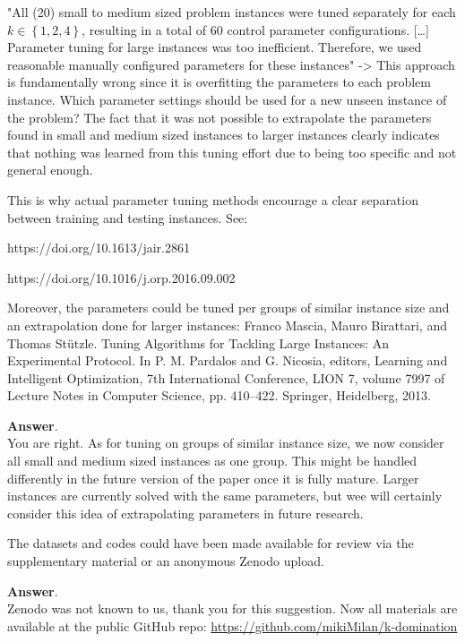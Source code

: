 \documentclass [11pt]{scrartcl}
\begin{document}
\begin{leftbar}
"All (20) small to medium sized problem instances were tuned separately for each $k\in\left\lbrace 1, 2, 4\right\rbrace $, resulting in a total of 60 control parameter configurations. […] Parameter tuning for large instances was too inefficient. Therefore, we used reasonable manually configured parameters for these
instances"
-> This approach is fundamentally wrong since it is overfitting the parameters to each problem instance. Which parameter settings should be used for a new unseen instance of the problem? The fact that it was not possible to extrapolate the parameters found in small and medium sized instances to larger instances clearly indicates that nothing was learned from this tuning effort due to being too specific and not general enough.

This is why actual parameter tuning methods encourage a clear separation between training and testing instances. See:

https://doi.org/10.1613/jair.2861

https://doi.org/10.1016/j.orp.2016.09.002

Moreover, the parameters could be tuned per groups of similar instance size and an extrapolation done for larger instances: Franco Mascia, Mauro Birattari, and Thomas Stützle. Tuning Algorithms for Tackling Large Instances: An Experimental Protocol. In P. M. Pardalos and G. Nicosia, editors, Learning and Intelligent Optimization, 7th International Conference, LION 7, volume 7997 of Lecture Notes in Computer Science, pp. 410–422. Springer, Heidelberg, 2013.	
\end{leftbar}

\textbf{Answer}. \\
You are right.
As for tuning on groups of similar instance size, we now consider all small and medium sized instances as one group. This might be handled differently in the future version of the paper once it is fully mature.
Larger instances are currently solved with the same parameters, but wee will certainly consider this idea of extrapolating parameters in future research.  

\begin{leftbar}
The datasets and codes could have been made available for review via the supplementary material or an anonymous Zenodo upload.
\end{leftbar}

\textbf{Answer}. \\
Zenodo was not known to us, thank you for this suggestion.
Now all materials are available at the public GitHub repo:
\url{https://github.com/mikiMilan/k-domination}
\end{document}
